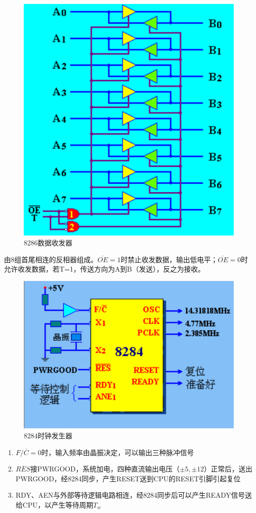 \begin{figure}[H]
    \centering
    \includegraphics[scale=1]{part_8086CPU/part_8086CPU_pic/8286数据收发器.png}
    \caption{8286数据收发器}
\end{figure}
由8组首尾相连的反相器组成。$\overline{OE}=1$时禁止收发数据，输出低电平；$\overline{OE}=0$时允许收发数据，若T=1，传送方向为A到B（发送），反之为接收。

\begin{figure}[H]
    \centering
    \includegraphics[scale=1]{part_8086CPU/part_8086CPU_pic/8284时钟发生器.png}
    \caption{8284时钟发生器}
\end{figure}
\begin{enumerate}
    \item $F/\overline{C}=0$时，输入频率由晶振决定，可以输出三种脉冲信号
    \item $\overline{RES}$接PWRGOOD，系统加电，四种直流输出电压（$\pm 5,\pm 12$）正常后，送出PWRGOOD，经8284同步，产生RESET送到CPU的RESET引脚引起复位
    \item RDY、AEN与外部等待逻辑电路相连，经8284同步后可以产生READY信号送给CPU，以产生等待周期$T_w$
\end{enumerate}
